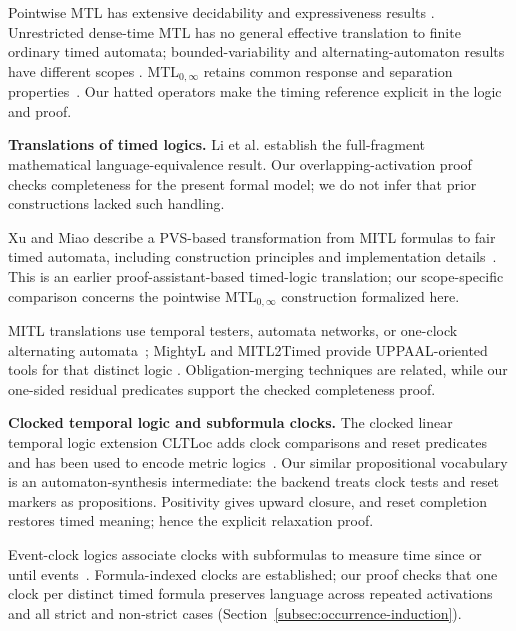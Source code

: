 \documentclass{ieeeaccess}
\newcommand{\runinhead}[1]{\par\noindent\textbf{#1}\enspace}
\begin{document}
Pointwise MTL has extensive decidability and expressiveness results
\cite{[RK90],[RTH96],MTLsem,ouaknine_worrell_lics05,
bouyer_chevalier_markey_fsttcs05}. Unrestricted dense-time MTL has no general
effective translation to finite ordinary timed automata; bounded-variability
and alternating-automaton results have different scopes
\cite{nickovic_piterman_formats10,[BM14]}. MTL$_{0,\infty}$ retains common
response and separation properties~\cite{[RTH96],[BDLG14]}. Our hatted
operators make the timing reference explicit in the logic and proof.

\runinhead{Translations of timed logics.}
Li et al. establish the full-fragment mathematical language-equivalence
result. Our overlapping-activation proof checks completeness for the present
formal model; we do not infer that prior constructions lacked such handling.

Xu and Miao describe a PVS-based transformation from MITL formulas to fair
timed automata, including construction principles and implementation
details~\cite{xu08}. This is an earlier proof-assistant-based timed-logic
translation; our scope-specific comparison concerns the pointwise
MTL$_{0,\infty}$ construction formalized here.

MITL translations use temporal testers, automata networks, or one-clock
alternating automata~\cite{maler_mitl_to_ta,
ferrere2019_realtimelogic_to_ta,[BM14]}; MightyL and MITL2Timed provide
UPPAAL-oriented tools for that distinct logic
\cite{mightyl_paper17,mitl2timed_github}. Obligation-merging techniques are
related, while our one-sided residual predicates support the checked
completeness proof.

\runinhead{Clocked temporal logic and subformula clocks.}
The clocked linear temporal logic extension CLTLoc adds clock comparisons and reset predicates and has been used to
encode metric logics~\cite{bersani_cltloc}. Our similar propositional
vocabulary is an automaton-synthesis intermediate: the backend treats clock
tests and reset markers as propositions. Positivity gives upward closure, and
reset completion restores timed meaning; hence the explicit relaxation proof.

Event-clock logics associate clocks with subformulas to measure time since or
until events~\cite{afh_eventclock_tcs99,
raskin_schobbens_jalc99,nickovic_piterman_formats10}. Formula-indexed clocks
are established; our proof checks that one clock per distinct timed formula
preserves language across repeated activations and all strict and non-strict
cases (Section~\ref{subsec:occurrence-induction}).
\end{document}
